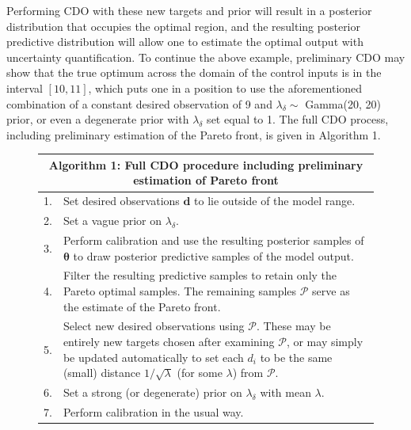\documentclass[12pt]{article}
\begin{document}
%
Performing CDO with these new targets and prior will result in a posterior distribution that occupies the optimal region, and the resulting posterior predictive distribution will allow one to estimate the optimal output with uncertainty quantification.
%
To continue the above example, preliminary CDO may show that the true optimum across the domain of the control inputs is in the interval $[10,11]$, which puts one in a position to use the aforementioned combination of a constant desired observation of 9 and $\lambda_\delta\sim$ Gamma(20, 20) prior, or even a degenerate prior with $\lambda_\delta$ set equal to 1.
%
The full CDO process, including preliminary estimation of the Pareto front, is given in Algorithm 1.

\begin{figure}
\centering
\begin{tabular}{|l|p{5.5in}|}
\hline
\multicolumn{2}{|c|}{Algorithm 1: Full CDO procedure including preliminary estimation of Pareto front}\\
\hline
1.&Set desired observations $\mathbf d$ to lie outside of the model range.\\
2.&  Set a vague prior on $\lambda_\delta$.\\
3.&  Perform calibration and use the resulting posterior samples of $\boldsymbol\theta$ to draw posterior predictive samples of the model output.\\
4.&  Filter the resulting predictive samples to retain only the Pareto optimal samples. The remaining samples $\mathcal P$ serve as the estimate of the Pareto front.\\
5.& Select new desired observations using $\mathcal P$. These may be entirely new targets chosen after examining $\mathcal P$, or may simply be updated automatically to set each $d_i$ to be the same (small) distance $1/\sqrt{\lambda}$ (for some $\lambda$) from $\mathcal P$.\\
6.& Set a strong (or degenerate) prior on $\lambda_\delta$ with mean $\lambda$.\\
7.& Perform calibration in the usual way.\\
\hline
\end{tabular}
\label{alg:CDO_alg}
\end{figure}
\end{document}
